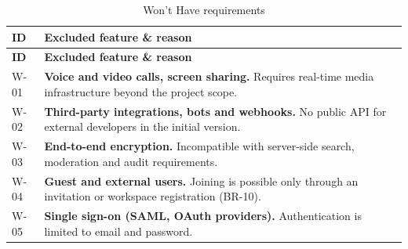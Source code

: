 \documentclass[
    english, %
]{VUMIFPSkursinis}
\begin{document}
\begin{longtable}{|p{}|p{}|}
\caption{Won't Have requirements}\\ \hline
\textbf{ID} & \textbf{Excluded feature \& reason} \\ \hline
\endfirsthead
\hline \textbf{ID} & \textbf{Excluded feature \& reason} \\ \hline
\endhead
W-01 & \textbf{Voice and video calls, screen sharing.} Requires real-time media infrastructure beyond the project scope. \\ \hline
W-02 & \textbf{Third-party integrations, bots and webhooks.} No public API for external developers in the initial version. \\ \hline
W-03 & \textbf{End-to-end encryption.} Incompatible with server-side search, moderation and audit requirements. \\ \hline
W-04 & \textbf{Guest and external users.} Joining is possible only through an invitation or workspace registration (BR-10). \\ \hline
W-05 & \textbf{Single sign-on (SAML, OAuth providers).} Authentication is limited to email and password. \\ \hline
\end{longtable}
\end{document}
